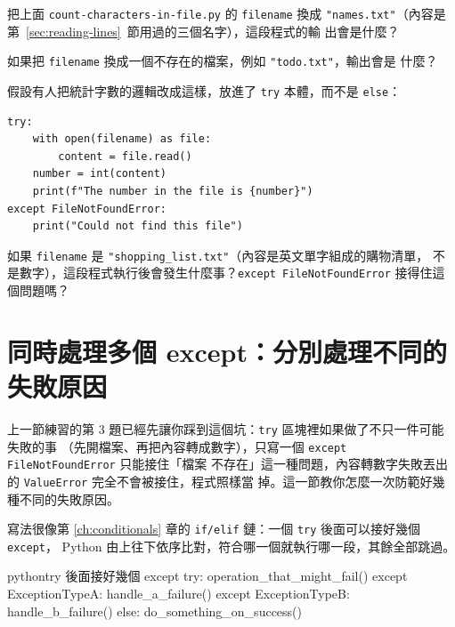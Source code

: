 

\begin{drills}[label=drills:try-except]
\item 把上面 \texttt{count-characters-in-file.py} 的 \texttt{filename} 換成
\texttt{"names.txt"}（內容是第~\ref{sec:reading-lines}~節用過的三個名字），這段程式的輸
出會是什麼？
\item 如果把 \texttt{filename} 換成一個不存在的檔案，例如 \texttt{"todo.txt"}，輸出會是
什麼？
\item 假設有人把統計字數的邏輯改成這樣，放進了 \texttt{try} 本體，而不是 \texttt{else}：
\begin{verbatim}
try:
    with open(filename) as file:
        content = file.read()
    number = int(content)
    print(f"The number in the file is {number}")
except FileNotFoundError:
    print("Could not find this file")
\end{verbatim}
如果 \texttt{filename} 是 \texttt{"shopping\_list.txt"}（內容是英文單字組成的購物清單，
不是數字），這段程式執行後會發生什麼事？\texttt{except FileNotFoundError} 接得住這個問題嗎？
\end{drills}

\section{同時處理多個 except：分別處理不同的失敗原因}
\label{sec:multiple-except}

上一節練習的第 3 題已經先讓你踩到這個坑：\texttt{try} 區塊裡如果做了不只一件可能失敗的事
（先開檔案、再把內容轉成數字），只寫一個 \texttt{except FileNotFoundError} 只能接住「檔案
不存在」這一種問題，內容轉數字失敗丟出的 \texttt{ValueError} 完全不會被接住，程式照樣當
掉。這一節教你怎麼一次防範好幾種不同的失敗原因。

寫法很像第 \ref{ch:conditionals} 章的 \texttt{if/elif} 鏈：一個 \texttt{try} 後面可以接好幾個 \texttt{except}，
Python 由上往下依序比對，符合哪一個就執行哪一段，其餘全部跳過。

\begin{code}{python}{try 後面接好幾個 except}
try:
    operation_that_might_fail()
except ExceptionTypeA:
    handle_a_failure()
except ExceptionTypeB:
    handle_b_failure()
else:
    do_something_on_success()
\end{code}

